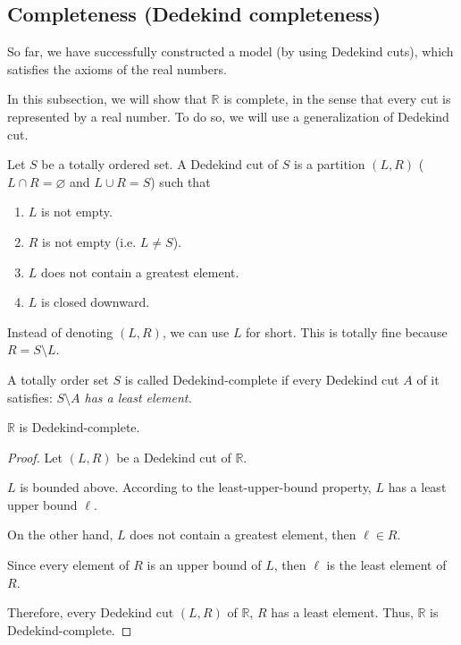 \subsection{Completeness (Dedekind completeness)}

So far, we have successfully constructed a model (by using Dedekind cuts), which satisfies the axioms of the real numbers.

In this subsection, we will show that $\mathbb{R}$ is complete, in the sense that every cut is represented by a real number. To do so, we will use a generalization of Dedekind cut.

\begin{definition}
    Let $S$ be a totally ordered set. A Dedekind cut of $S$ is a partition $(L, R)$ ($L\cap R = \varnothing$ and $L\cup R = S$) such that
    \begin{enumerate}[label={(\roman*)}]
        \item $L$ is not empty.
        \item $R$ is not empty (i.e. $L\ne S$).
        \item $L$ does not contain a greatest element.
        \item $L$ is closed downward.
    \end{enumerate}
\end{definition}

Instead of denoting $(L, R)$, we can use $L$ for short. This is totally fine because $R = S\setminus L$.

\begin{definition}
    A totally order set $S$ is called Dedekind-complete if every Dedekind cut $A$ of it satisfies: \textit{$S\setminus A$ has a least element.}
\end{definition}

\begin{theorem}
    $\mathbb{R}$ is Dedekind-complete.
\end{theorem}

\begin{proof}
    Let $(L, R)$ be a Dedekind cut of $\mathbb{R}$.

    $L$ is bounded above. According to the least-upper-bound property, $L$ has a least upper bound $\ell$.

    On the other hand, $L$ does not contain a greatest element, then $\ell\in R$.

    Since every element of $R$ is an upper bound of $L$, then $\ell$ is the least element of $R$.

    Therefore, every Dedekind cut $(L, R)$ of $\mathbb{R}$, $R$ has a least element. Thus, $\mathbb{R}$ is Dedekind-complete.
\end{proof}

